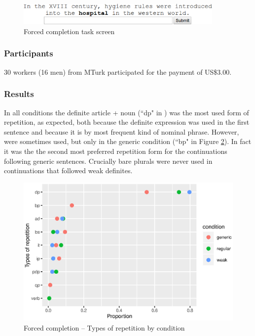 \documentclass[output=paper,
modfonts
]{langscibook}
\begin{document}
\begin{figure}[H]
\centering
\includegraphics[width=0.9\textwidth]{figures/fig_cfinput}
\caption{Forced completion task screen}
\label{fig:desaetal:10}
\end{figure}


\subsubsection{Participants}
30 workers (16 men) from MTurk participated for the payment of US\$3.00. 

\subsubsection{Results}

In all conditions the definite article + noun (“dp" in ) was the most used form of repetition, as expected, both because the definite expression was used in the first sentence and because it is by most frequent kind of nominal phrase. However,  were sometimes used, but only in the generic condition (“bp" in Figure \ref{fig:desaetal:11}). In fact it was the the second most preferred repetition form for the continuations following generic sentences. Crucially bare plurals were never used in continuations that followed weak definites.


\begin{figure}[H]
\centering
\includegraphics[width=1\textwidth]{figures/graf_cfcomo}
\caption{Forced completion -- Types of repetition by condition}
\label{fig:desaetal:11}
\end{figure}
\end{document}
